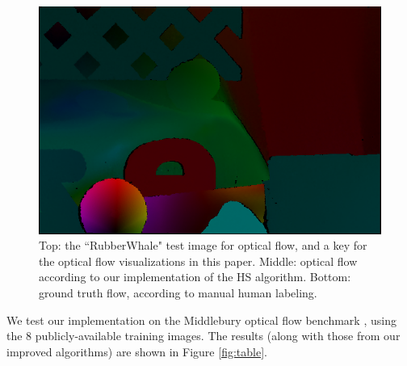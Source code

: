 \documentclass[10pt,twocolumn,letterpaper]{article}
\begin{document}
\begin{figure}
\includegraphics[width=\columnwidth]{ground_truth.png}
\caption{Top: the ``RubberWhale" test image for optical flow, and a key for the optical flow visualizations in this paper.  Middle: optical flow according to our implementation of the HS algorithm.  Bottom: ground truth flow, according to manual human labeling.}
\label{fig:hs}
\end{figure}

We test our implementation on the Middlebury optical flow benchmark \cite{middlebury}, using the 8 publicly-available training images.  The results (along with those from our improved algorithms) are shown in Figure \ref{fig:table}.
\end{document}
